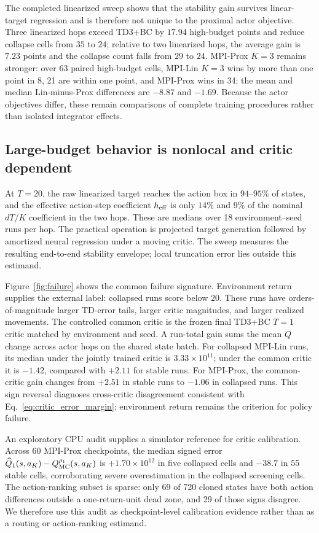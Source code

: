 The completed linearized sweep shows that the stability gain survives linear-target regression and is therefore not unique to the proximal actor objective. Three linearized hops exceed TD3+BC by $17.94$ high-budget points and reduce collapse cells from $35$ to $24$; relative to two linearized hops, the average gain is $7.23$ points and the collapse count falls from $29$ to $24$. MPI-Prox $K=3$ remains stronger: over 63 paired high-budget cells, MPI-Lin $K=3$ wins by more than one point in 8, 21 are within one point, and MPI-Prox wins in 34; the mean and median Lin-minus-Prox differences are $-8.87$ and $-1.69$. Because the actor objectives differ, these remain comparisons of complete training procedures rather than isolated integrator effects.

\subsection{Large-budget behavior is nonlocal and critic dependent}

At $T=20$, the raw linearized target reaches the action box in
$94$--$95\%$ of states, and the effective action-step coefficient
$h_{\rm eff}$ is only $14\%$ and $9\%$ of the nominal $dT/K$ coefficient in
the two hops. These are medians over 18 environment--seed runs per hop. The
practical operation is projected target generation followed by amortized neural
regression under a moving critic. The sweep measures the resulting end-to-end
stability envelope; local truncation error lies outside this estimand.

Figure~\ref{fig:failure} shows the common failure signature. Environment
return supplies the external label: collapsed runs score below $20$. These
runs have orders-of-magnitude larger TD-error tails, larger critic magnitudes,
and larger realized movements. The controlled common critic is the frozen
final TD3+BC $T=1$ critic matched by environment and seed. A run-total gain
sums the mean $Q$ change across actor hops on the shared state batch. For
collapsed MPI-Lin runs, its median under the jointly trained critic is
$3.33\times10^{11}$; under the common critic it is $-1.42$, compared with
$+2.11$ for stable runs. For MPI-Prox, the common-critic gain changes from
$+2.51$ in stable runs to $-1.06$ in collapsed runs. This sign reversal
diagnoses cross-critic disagreement consistent with
Eq.~\eqref{eq:critic_error_margin}; environment return remains the criterion
for policy failure.

An exploratory CPU audit supplies a simulator reference for critic calibration.
Across 60 MPI-Prox checkpoints, the median signed error
$\widehat Q_1(s,a_K)-Q_{\rm MC}^{\rho_1}(s,a_K)$ is
$+1.70\times10^{12}$ in five collapsed cells and $-38.7$ in 55 stable cells,
corroborating severe overestimation in the collapsed screening cells. The
action-ranking subset is sparse: only 69 of 720 cloned states have both action
differences outside a one-return-unit dead zone, and 29 of those signs
disagree. We therefore use this audit as checkpoint-level calibration evidence
rather than as a routing or action-ranking estimand.

